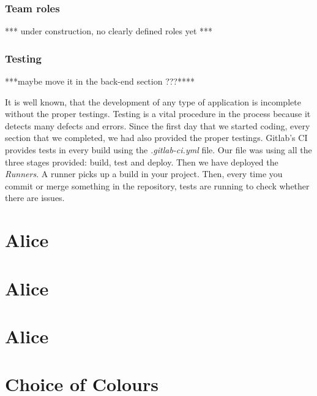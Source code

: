 \documentclass{l3proj}
\begin{document}
\subsubsection{Team roles}
\label{roles}
*** under construction, no clearly defined roles yet ***
 
\subsubsection{Testing}
\label{testing}
***maybe move it in the back-end section ???****

It is well known, that the development of any type of application is incomplete without the proper testings. Testing is a vital procedure in the process because it detects many defects and errors. Since the first day that we started coding, every section that we completed, we had also provided the proper testings. Gitlab's CI provides tests in every build using the \textit{.gitlab-ci.yml} file. Our file was using all the three stages provided: build, test and deploy. Then we have deployed the \textit{Runners}. A runner picks up a build in your project. Then, every time you commit or merge something in the repository, tests are running to check whether there are issues.





\section{Alice}
\label{sec:alice}



\section{Alice}
\label{sec:alice}



\section{Alice}
\label{sec:alice}




\section{Choice of Colours}
\label{design}
\end{document}

